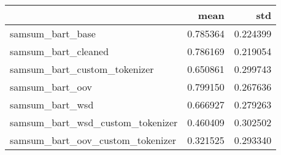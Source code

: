 \begin{tabular}{lrr}
\toprule
 & mean & std \\
\midrule
samsum_bart_base & 0.785364 & 0.224399 \\
samsum_bart_cleaned & 0.786169 & 0.219054 \\
samsum_bart_custom_tokenizer & 0.650861 & 0.299743 \\
samsum_bart_oov & 0.799150 & 0.267636 \\
samsum_bart_wsd & 0.666927 & 0.279263 \\
samsum_bart_wsd_custom_tokenizer & 0.460409 & 0.302502 \\
samsum_bart_oov_custom_tokenizer & 0.321525 & 0.293340 \\
\bottomrule
\end{tabular}
